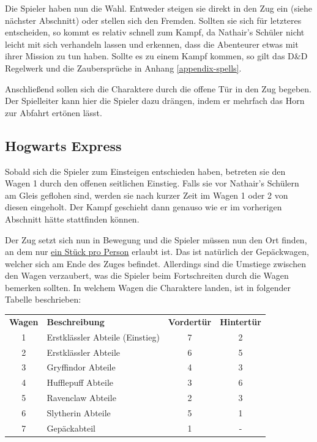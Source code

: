 \documentclass[]{scrartcl}
\begin{document}

Die Spieler haben nun die Wahl. Entweder steigen sie direkt in den Zug ein (siehe nächster Abschnitt) oder stellen sich den Fremden. Sollten sie sich für letzteres entscheiden, so kommt es relativ schnell zum Kampf, da Nathair's Schüler nicht leicht mit sich verhandeln lassen und erkennen, dass die Abenteurer etwas mit ihrer Mission zu tun haben. Sollte es zu einem Kampf kommen, so gilt das D\&D Regelwerk und die Zaubersprüche in Anhang \ref{appendix-spells}.

Anschließend sollen sich die Charaktere durch die offene Tür in den Zug begeben. Der Spielleiter kann hier die Spieler dazu drängen, indem er mehrfach das Horn zur Abfahrt ertönen lässt.

\subsection{Hogwarts Express}

Sobald sich die Spieler zum Einsteigen entschieden haben, betreten sie den Wagen 1 durch den offenen seitlichen Einstieg. Falls sie vor Nathair's Schülern am Gleis geflohen sind, werden sie nach kurzer Zeit im Wagen 1 oder 2 von diesen eingeholt. Der Kampf geschieht dann genauso wie er im vorherigen Abschnitt hätte stattfinden können.

Der Zug setzt sich nun in Bewegung und die Spieler müssen nun den Ort finden, an dem nur \underline{ein Stück pro Person} erlaubt ist. Das ist natürlich der Gepäckwagen, welcher sich am Ende des Zuges befindet. Allerdings sind die Umstiege zwischen den Wagen verzaubert, was die Spieler beim Fortschreiten durch die Wagen bemerken sollten. In welchem Wagen die Charaktere landen, ist in folgender Tabelle beschrieben:\\

\begin{center}
	\begin{tabularx}{0.8\linewidth}{clcc}
		\textbf{Wagen} & \textbf{Beschreibung} & \textbf{Vordertür} & \textbf{Hintertür}\\
		1 & Erstklässler Abteile (Einstieg) & 7 & 2\\
		2 & Erstklässler Abteile & 6 & 5\\
		3 & Gryffindor Abteile & 4 & 3\\
		4 & Hufflepuff Abteile & 3 & 6\\
		5 & Ravenclaw Abteile & 2 & 3\\
		6 & Slytherin Abteile & 5 & 1\\
		7 & Gepäckabteil & 1 & -
	\end{tabularx}
\end{center}
\end{document}

